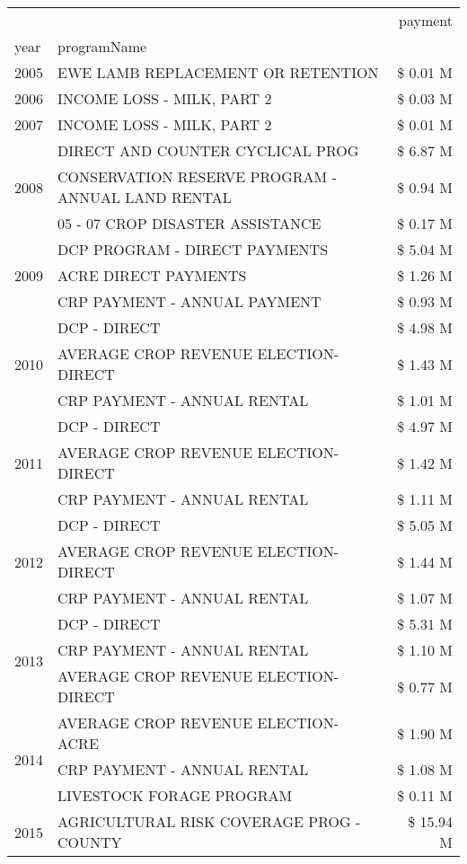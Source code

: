 \begin{tabular}{llr}
\toprule
 &  & payment \\
year & programName &  \\
\midrule
2005 & EWE LAMB REPLACEMENT OR RETENTION & \$ 0.01 M \\
\cline{1-3}
2006 & INCOME LOSS - MILK, PART 2 & \$ 0.03 M \\
\cline{1-3}
2007 & INCOME LOSS - MILK, PART 2 & \$ 0.01 M \\
\cline{1-3}
\multirow[t]{3}{*}{2008} & DIRECT AND COUNTER CYCLICAL PROG & \$ 6.87 M \\
 & CONSERVATION RESERVE PROGRAM - ANNUAL LAND RENTAL & \$ 0.94 M \\
 & 05 - 07 CROP DISASTER ASSISTANCE & \$ 0.17 M \\
\cline{1-3}
\multirow[t]{3}{*}{2009} & DCP PROGRAM - DIRECT PAYMENTS & \$ 5.04 M \\
 & ACRE DIRECT PAYMENTS & \$ 1.26 M \\
 & CRP PAYMENT - ANNUAL PAYMENT & \$ 0.93 M \\
\cline{1-3}
\multirow[t]{3}{*}{2010} & DCP - DIRECT & \$ 4.98 M \\
 & AVERAGE CROP REVENUE ELECTION-DIRECT & \$ 1.43 M \\
 & CRP PAYMENT - ANNUAL RENTAL & \$ 1.01 M \\
\cline{1-3}
\multirow[t]{3}{*}{2011} & DCP - DIRECT & \$ 4.97 M \\
 & AVERAGE CROP REVENUE ELECTION-DIRECT & \$ 1.42 M \\
 & CRP PAYMENT - ANNUAL RENTAL & \$ 1.11 M \\
\cline{1-3}
\multirow[t]{3}{*}{2012} & DCP - DIRECT & \$ 5.05 M \\
 & AVERAGE CROP REVENUE ELECTION-DIRECT & \$ 1.44 M \\
 & CRP PAYMENT - ANNUAL RENTAL & \$ 1.07 M \\
\cline{1-3}
\multirow[t]{3}{*}{2013} & DCP - DIRECT & \$ 5.31 M \\
 & CRP PAYMENT - ANNUAL RENTAL & \$ 1.10 M \\
 & AVERAGE CROP REVENUE ELECTION-DIRECT & \$ 0.77 M \\
\cline{1-3}
\multirow[t]{3}{*}{2014} & AVERAGE CROP REVENUE ELECTION-ACRE & \$ 1.90 M \\
 & CRP PAYMENT - ANNUAL RENTAL & \$ 1.08 M \\
 & LIVESTOCK FORAGE PROGRAM & \$ 0.11 M \\
\cline{1-3}
\multirow[t]{3}{*}{2015} & AGRICULTURAL RISK COVERAGE PROG - COUNTY & \$ 15.94 M \\

\end{tabular}
